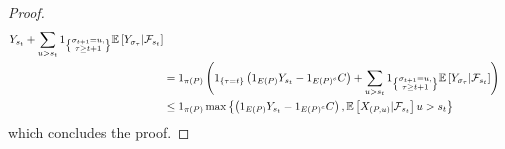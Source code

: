 \begin{proof}
\begin{align*}
{{            }
            Y_{s_{t}}
            +
            \sum_{
                u>s_{t}}
            1_{
                \left\{
                    \substack{
                        \sigma_{t+1}=u,
                        \\
                        \tau\geq t+1
                    }
                \right\}
            }
            \mathbb{E}\left[
                Y_{
                    \sigma_{\tau}
                }
                | \mathcal{F}_{s_{t}}
            \right]
        }
        \\
        &=
        1_{
            \pi\left(P\right)
        }
        \left(
            1_{
                \left\{\tau=t\right\}
            }
            \left(
                1_{
                    E\left(P\right)
                }
                Y_{s_{t}}
                -
                1_{
                    E\left(P\right)^c
                }
                C
            \right)        
            +
            \sum_{
                u>s_{t}
            }
            1_{
                \left\{
                    \substack{
                        \sigma_{t+1}=u,
                        \\
                        \tau\geq t+1
                    }
                \right\}
            }
            \mathbb{E}\left[
                Y_{
                    \sigma_{\tau}
                }
                | \mathcal{F}_{s_{t}}
            \right]
        \right)
        \\
        &\leq
        1_{
            \pi\left(P\right)
        }
        \max\left\{
            \left(
                1_{
                    E\left(P\right)
                }
                Y_{s_{t}}
                -
                1_{
                    E\left(P\right)^c
                }
                C
            \right),
            \mathbb{E}\left[
                X_{
                    \left(
                        P, u
                    \right)
                }
                |
                \mathcal{F}_{s_{t}}
            \right]
            u
            > s_{t} 
        \right\}
    \end{align*}  
    which concludes the proof.
\end{proof}  

